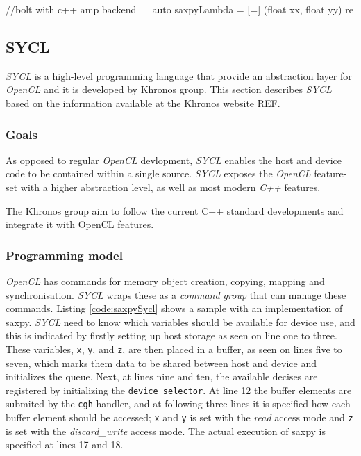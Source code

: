 //bolt with c++ amp backend ~\label{code:boltSaxpy:cppamp}~
auto saxpyLambda = [=] (float xx, float yy) re

\subsection{SYCL}
\textit{SYCL} is a high-level programming language that provide an abstraction layer for \textit{OpenCL} and it is developed by Khronos group. This section describes \textit{SYCL} based on the information available at the Khronos website REF.

\subsubsection{Goals}
As opposed to regular \textit{OpenCL} devlopment, \textit{SYCL} enables the host and device code to be contained within a single source. \textit{SYCL} exposes the \textit{OpenCL} feature-set with a higher abstraction level, as well as most modern \textit{C++} features. 

The Khronos group aim to follow the current C++ standard developments and integrate it with OpenCL features.

\subsubsection{Programming model}
\textit{OpenCL} has commands for memory object creation, copying, mapping and synchronisation. \textit{SYCL} wraps these as a \textit{command group} that can manage these commands. Listing \ref{code:saxpySycl} shows a sample with an implementation of saxpy. \textit{SYCL} need to know which variables should be available for device use, and this is indicated by firstly setting up host storage as seen on line one to three. These variables, \texttt{x}, \texttt{y}, and \texttt{z}, are then placed in a buffer, as seen on lines five to seven, which marks them data to be shared between host and device and initializes the queue. Next, at lines nine and ten, the available decises are registered by initializing the \texttt{device\_selector}. At line 12 the buffer elements are submited by the \texttt{cgh} handler, and at following three lines it is specified how each buffer element should be accessed; \texttt{x} and \texttt{y} is set with the \textit{read} access mode and \texttt{z} is set with the \textit{discard\_write} access mode. The actual execution of saxpy is specified at lines 17 and 18.

